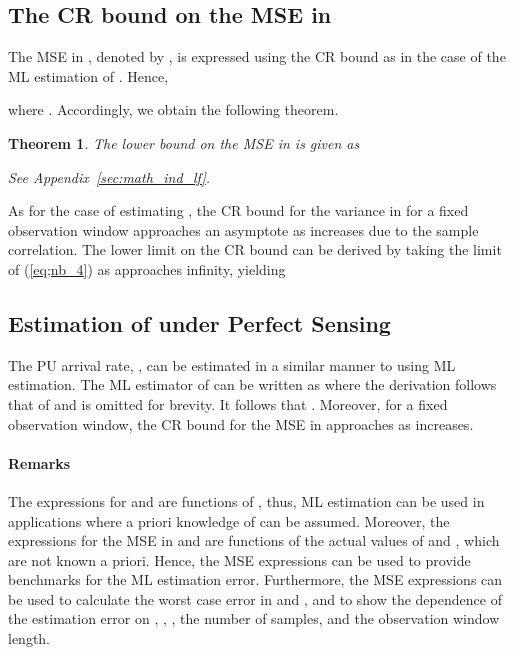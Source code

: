 \documentclass[11pt,draftclsnofoot,journal,onecolumn]{IEEEtran}
\newtheorem{theorem}{Theorem}
\begin{document}
\subsection{The CR bound on the MSE in }
\label{sec:lambda_f_estimation_error}

The MSE in , denoted by , is expressed using the CR bound as in the case of the ML estimation of . Hence, 

where . Accordingly, we obtain the following theorem.
\begin{theorem}
The lower bound on the MSE in  is given as

\begin{IEEEproof}
See Appendix~\ref{sec:math_ind_lf}.
\end{IEEEproof}
\end{theorem}
As for the case of estimating , the CR bound for the variance in  for a fixed observation window approaches an asymptote as  increases due to the sample correlation. The lower limit on the CR bound can be derived by taking the limit of (\ref{eq;nb_4}) as  approaches infinity, yielding


\subsection{Estimation of  under Perfect Sensing}
\label{sec:lambda_n_estimation_ML}

The PU arrival rate, , can be estimated in a similar manner to  using ML estimation. The ML estimator of  can be written as  where the derivation follows that of  and is omitted for brevity. It follows that . Moreover, for a fixed observation window, the CR bound for the MSE in  approaches  as  increases.

\paragraph*{Remarks}
\label{sec:lambda_f_estimation_ML_Remarks}

The expressions for  and  are functions of , thus, ML estimation can be used in applications where a priori knowledge of  can be assumed. Moreover, the expressions for the MSE in  and  are functions of the actual values of  and , which are not known a priori. Hence, the MSE expressions can be used to provide benchmarks for the ML estimation error. Furthermore, the MSE expressions can be used to calculate the worst case error in  and , and to show the dependence of the estimation error on , , , the number of samples, and the observation window length.
\end{document}
